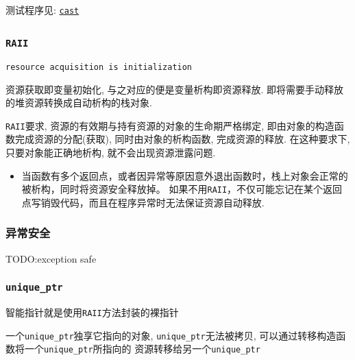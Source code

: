 测试程序见: \href{https://github.com/wenqingqian/Obtuse/blob/main/test/cpp/c++11/cast.cpp}{\tt cast}
\subsection{\color{purple}{智能指针}}
\subsubsection{\tt RAII}

{\tt resource acquisition is initialization}

资源获取即变量初始化, 与之对应的便是变量析构即资源释放. 即将需要手动释放的堆资源转换成自动析构的栈对象.

{\tt RAII}要求, 资源的有效期与持有资源的对象的生命期严格绑定, 即由对象的构造函数完成资源的分配(获取), 
同时由对象的析构函数, 完成资源的释放. 在这种要求下, 只要对象能正确地析构, 就不会出现资源泄露问题.

\begin{itemize}
	\item 当函数有多个返回点，或者因异常等原因意外退出函数时，栈上对象会正常的被析构，同时将资源安全释放掉。
			如果不用{\tt RAII}，不仅可能忘记在某个返回点写销毁代码，而且在程序异常时无法保证资源自动释放.
\end{itemize}
\subsubsection{异常安全}
TODO:exception safe
\subsubsection{\tt unique\_ptr}
智能指针就是使用{\tt RAII}方法封装的裸指针

一个{\tt unique\_ptr}独享它指向的对象, {\tt unique\_ptr}无法被拷贝, 可以通过转移构造函数将一个{\tt unique\_ptr}所指向的
	资源转移给另一个{\tt unique\_ptr}

